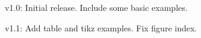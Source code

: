 v1.0: Initial release. Include some basic examples.

v1.1: Add table and tikz examples. Fix figure index. 
